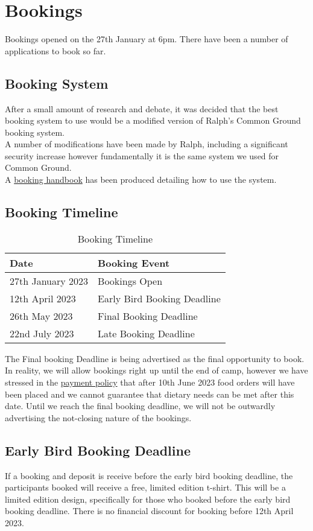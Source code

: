\chapter{Bookings}
Bookings opened on the 27th January at 6pm. There have been a number of applications to book so far.

\section{Booking System}
After a small amount of research and debate, it was decided that the best booking system to use would be a modified version of Ralph's Common Ground booking system.\\

A number of modifications have been made by Ralph, including a significant security increase however fundamentally it is the same system we used for Common Ground.\\

A \href{https://venturercamp.org.uk/resources/}{booking handbook} has been produced detailing how to use the system. 

\section{Booking Timeline}
\begin{table}[H]
    \begin{tabularx}{\textwidth}{XX}
        \textbf{Date} & \textbf{Booking Event}\\
        \hline
        \hline
        27th January 2023 & Bookings Open\\
        \hline
        12th April 2023 & Early Bird Booking Deadline\\
        \hline
        26th May 2023 & Final Booking Deadline\\
        \hline
        22nd July 2023 & Late Booking Deadline\\
        \hline
    \end{tabularx}
    \caption{Booking Timeline}
\end{table}
The Final booking Deadline is being advertised as the final opportunity to book. In reality, we will allow bookings right up until the end of camp, however we have stressed in the \href{https://venturercamp.org.uk/wp-content/uploads/2023/01/payment-policy-v1.pdf}{payment policy} that after 10th June 2023 food orders will have been placed and we cannot guarantee that dietary needs can be met after this date. Until we reach the final booking deadline, we will not be outwardly advertising the not-closing nature of the bookings. 

\section{Early Bird Booking Deadline}
If a booking and deposit is receive before the early bird booking deadline, the participants booked will receive a free, limited edition t-shirt. This will be a limited edition design, specifically for those who booked before the early bird booking deadline. There is no financial discount for booking before 12th April 2023.